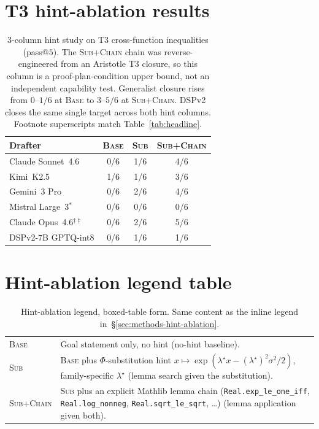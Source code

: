 \appendix
\section{T3 hint-ablation results}
\label{app:hint-ablation-table}

\begin{table}[!t]
\centering
\small
\caption{3-column hint study on T3 cross-function inequalities
(pass@$5$). The \textsc{Sub+Chain} chain was reverse-engineered
from an Aristotle T3 closure, so this column is a
proof-plan-condition upper bound, not an independent capability
test. Generalist closure rises from $0$--$1/6$ at \textsc{Base}
to $3$--$5/6$ at \textsc{Sub+Chain}. DSPv2 closes the same
single target across both hint columns. Footnote superscripts
match Table~\ref{tab:headline}.}
\label{tab:ablation}
\begin{tabular}{lccc}
\toprule
Drafter & \textsc{Base} & \textsc{Sub} & \textsc{Sub+Chain} \\
\midrule
Claude Sonnet~4.6  & 0/6 & 1/6 & 4/6 \\
Kimi~K2.5          & 1/6 & 1/6 & 3/6 \\
Gemini~3 Pro       & 0/6 & 2/6 & 4/6 \\
Mistral Large~3$^{\ast}$ & 0/6 & 0/6 & 0/6 \\
\midrule
Claude Opus~4.6$^{\ddagger\ddagger}$ & 0/6 & 2/6 & 5/6 \\
DSPv2-$7$B GPTQ-int$8$ & 0/6 & 1/6 & 1/6 \\
\bottomrule
\end{tabular}
\end{table}

\section{Hint-ablation legend table}
\label{app:hint-legend-table}

\begin{table}[!t]
\centering
\small
\setlength{\tabcolsep}{4pt}
\caption{Hint-ablation legend, boxed-table form. Same content as the
inline legend in~\S\ref{sec:methods-hint-ablation}.}
\label{tab:hint-legend}
\begin{tabular}{@{}lp{}@{}}
\toprule
\textsc{Base}      & Goal statement only, no hint (no-hint baseline). \\
\textsc{Sub}       & \textsc{Base} plus $\Phi$-substitution hint
                     $x \mapsto \exp(\lambda^{\star} x -
                     (\lambda^{\star})^{2}\sigma^{2}/2)$,
                     family-specific $\lambda^{\star}$ (lemma search
                     given the substitution). \\
\textsc{Sub+Chain} & \textsc{Sub} plus an explicit Mathlib lemma chain
                     (\texttt{Real.exp\_le\_one\_iff},
                     \texttt{Real.log\_nonneg},
                     \texttt{Real.sqrt\_le\_sqrt}, \dots)
                     (lemma application given both). \\
\bottomrule
\end{tabular}

\end{table}

